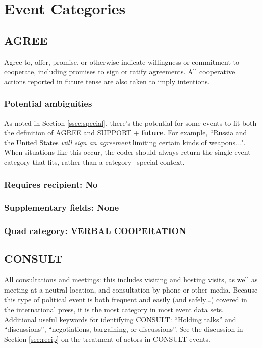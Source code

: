 \documentclass[11pt]{report}
\newcommand{\plcat}[1]{\textsf{#1}}
\newcommand{\plcon}[1]{\textbf{#1}}
\begin{document}
\chapter{Event Categories}

\section{AGREE}


Agree to, offer, promise, or otherwise indicate willingness or commitment to cooperate, including promises to sign or ratify agreements.  All cooperative actions reported in future tense are also taken to imply intentions. 


\subsection{Potential ambiguities}

As noted in Section \ref{ssec:special}, there's the potential for some events to fit both the definition of \plcat{AGREE} and \plcat{SUPPORT} + \plcon{future}. For example, ``Russia and the United States \emph{will sign an agreement} limiting certain kinds of weapons...". When situations like this occur, the coder should always return the single event category that fits, rather than a category+special context.

\subsection{Requires recipient: No}

\subsection{Supplementary fields: None}

\subsection{Quad category: VERBAL COOPERATION}

\newpage

\section{CONSULT}

All consultations and meetings: this includes visiting and hosting visits, as well as meeting at a neutral location, and consultation by phone or other media. Because this type of political event is both frequent and easily (and safely\ldots) covered in the international press, it is the most category in most event data sets.  Additional useful keywords for identifying \plcat{CONSULT}: ``Holding talks'' and ``discussions'', ``negotiations, bargaining, or discussions''. See the discussion in Section \ref{sec:recip} on the treatment of actors in \plcat{CONSULT} events.
\end{document}
